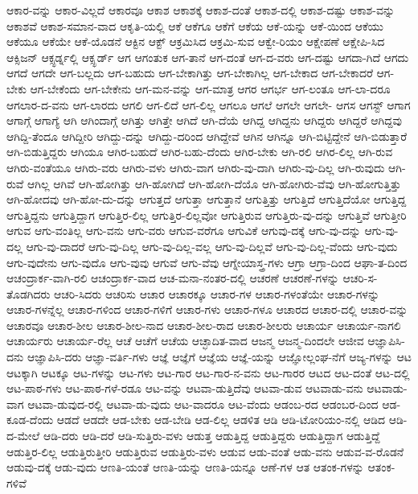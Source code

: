 {ಆಕಾರ-ವನ್ನು
ಆಕಾರ-ವಿಲ್ಲದೆ
ಆಕಾರವೂ
ಆಕಾಶ
ಆಕಾಶಕ್ಕೆ
ಆಕಾಶ-ದಂತೆ
ಆಕಾಶ-ದಲ್ಲಿ
ಆಕಾಶ-ದಷ್ಟು
ಆಕಾಶ-ವನ್ನು
ಆಕಾಶವೆ
ಆಕಾಶ-ಸಮಾನ-ವಾದ
ಆಕೃತಿ-ಯಲ್ಲಿ
ಆಕೆ
ಆಕೆಗೂ
ಆಕೆಗೆ
ಆಕೆಯ
ಆಕೆ-ಯನ್ನು
ಆಕೆ-ಯಿಂದ
ಆಕೆಯು
ಆಕೆಯೂ
ಆಕೆಯೇ
ಆಕೆ-ಯೊಡನೆ
ಆಕ್ಟಿನ
ಆಕ್ಟ್
ಆಕ್ರಮಿಸಿದ
ಆಕ್ರಮಿ-ಸುವ
ಆಕ್ವೇ-ರಿಯಂ
ಆಕ್ಷೇಪಣೆ
ಆಕ್ಷೇಪಿ-ಸಿದ
ಆಕ್ಸಿಜನ್
ಆಕ್ಸ್ಫರ್ಡ್ನಲ್ಲಿ
ಆಕ್ಸ್ಫರ್ಡ್
ಆಗ
ಆಗಂತುಕ
ಆಗ-ತಾನೆ
ಆಗ-ದಂತೆ
ಆಗ-ದ-ವರು
ಆಗ-ದಷ್ಟು
ಆಗದಾ-ಗಿದೆ
ಆಗದು
ಆಗದೆ
ಆಗದೇ
ಆಗ-ಬಲ್ಲದು
ಆಗ-ಬಹುದು
ಆಗ-ಬೇಕಾಗಿತ್ತು
ಆಗ-ಬೇಕಾಗಿಲ್ಲ
ಆಗ-ಬೇಕಾದ
ಆಗ-ಬೇಕಾದರೆ
ಆಗ-ಬೇಕು
ಆಗ-ಬೇಕೆಂದು
ಆಗ-ಬೇಕೇನು
ಆಗ-ಮನ-ವನ್ನು
ಆಗ-ಮಾತ್ರ
ಆಗರ
ಆಗರ್ಭ
ಆಗ-ಲಂತೂ
ಆಗ-ಲಾ-ದರೂ
ಆಗಲಾರ-ದ-ವನು
ಆಗ-ಲಾರದು
ಆಗಲಿ
ಆಗ-ಲಿದೆ
ಆಗ-ಲಿಲ್ಲ
ಆಗಲೂ
ಆಗಲೆ
ಆಗಲೇ
ಆಗಲೇ-
ಆಗಸ
ಆಗಸ್ಟ್
ಆಗಾಗ
ಆಗಾಗ್ಗೆ
ಆಗಾಗ್ಯೆ
ಆಗಿ
ಆಗಿಂದಾಗ್ಗೆ
ಆಗಿತ್ತು
ಆಗಿತ್ತೇ
ಆಗಿದೆ
ಆಗಿ-ದೆಯೆ
ಆಗಿದ್ದ
ಆಗಿದ್ದನು
ಆಗಿದ್ದರು
ಆಗಿದ್ದರೆ
ಆಗಿದ್ದವು
ಆಗಿದ್ದಿ-ತೆಂದೂ
ಆಗಿದ್ದೀರಿ
ಆಗಿದ್ದು-ದನ್ನು
ಆಗಿದ್ದು-ದರಿಂದ
ಆಗಿದ್ದೇವೆ
ಆಗಿನ
ಆಗಿನ್ನೂ
ಆಗಿ-ಬಿಟ್ಟಿದ್ದೇನೆ
ಆಗಿ-ಬಿಡುತ್ತಾರೆ
ಆಗಿ-ಬಿಡುತ್ತಿದ್ದರು
ಆಗಿಯೂ
ಆಗಿರ-ಬಹುದೆ
ಆಗಿರ-ಬಹು-ದೆಂದು
ಆಗಿರ-ಬೇಕು
ಆಗಿ-ರಲಿ
ಆಗಿರ-ಲಿಲ್ಲ
ಆಗಿ-ರುವ
ಆಗಿರು-ವಂತೆಯೂ
ಆಗಿರು-ವರು
ಆಗಿರು-ವಳು
ಆಗಿರು-ವಾಗ
ಆಗಿರು-ವು-ದಾಗಿ
ಆಗಿರು-ವು-ದಿಲ್ಲ
ಆಗಿ-ರುವುದು
ಆಗಿ-ರುವೆ
ಆಗಿಲ್ಲ
ಆಗಿವೆ
ಆಗಿ-ಹೋಗಿತ್ತು
ಆಗಿ-ಹೋಗಿದೆ
ಆಗಿ-ಹೋಗಿ-ದೆಯೊ
ಆಗಿ-ಹೋಗಿರು-ವೆವು
ಆಗಿ-ಹೋಗುತ್ತಿತ್ತು
ಆಗಿ-ಹೋದವು
ಆಗಿ-ಹೋ-ದು-ದನ್ನು
ಆಗುತ್ತದೆ
ಆಗುತ್ತಾ
ಆಗುತ್ತಾನೆ
ಆಗುತ್ತಿತ್ತು
ಆಗುತ್ತಿದೆ
ಆಗುತ್ತಿದೆಯೋ
ಆಗುತ್ತಿದ್ದ
ಆಗುತ್ತಿದ್ದನು
ಆಗುತ್ತಿದ್ದಾಗ
ಆಗುತ್ತಿರ-ಲಿಲ್ಲ
ಆಗುತ್ತಿರ-ಲಿಲ್ಲವೋ
ಆಗುತ್ತಿರುವ
ಆಗುತ್ತಿರು-ವು-ದನ್ನು
ಆಗುತ್ತಿವೆ
ಆಗುತ್ತೀರಿ
ಆಗುವ
ಆಗು-ವಂತಿಲ್ಲ
ಆಗು-ವನು
ಆಗು-ವರು
ಆಗುವ-ವರೆಗೂ
ಆಗುವಿಕೆ
ಆಗುವು-ದಕ್ಕೆ
ಆಗು-ವು-ದನ್ನು
ಆಗು-ವು-ದಲ್ಲ
ಆಗು-ವು-ದಾದರೆ
ಆಗು-ವು-ದಿಲ್ಲ
ಆಗು-ವು-ದಿಲ್ಲ-ವಲ್ಲ
ಆಗು-ವು-ದಿಲ್ಲವೆ
ಆಗು-ವು-ದಿಲ್ಲ-ವೆಂದು
ಆಗು-ವುದು
ಆಗು-ವುದೇನು
ಆಗು-ವುದೊ
ಆಗು-ವುವು
ಆಗುವೆ
ಆಗು-ವೆವು
ಆಗ್ನೇಯಾಸ್ತ್ರ-ಗಳು
ಆಗ್ರಾ
ಆಗ್ರಾ-ದಿಂದ
ಆಘಾ-ತ-ದಿಂದ
ಆಚಂದ್ರಾರ್ಕ-ವಾಗಿ-ರಲಿ
ಆಚಂದ್ರಾರ್ಕ-ವಾದ
ಆಚ-ಮನಾ-ನಂತರ-ದಲ್ಲಿ
ಆಚರಣೆ
ಆಚರಣೆ-ಗಳನ್ನು
ಆಚರಿ-ಸ-ತೊಡಗಿದರು
ಆಚರಿ-ಸಿದರು
ಆಚರಿಸು
ಆಚಾರ
ಆಚಾರಕ್ಕೂ
ಆಚಾರ-ಗಳ
ಆಚಾರ-ಗಳಂತೆಯೇ
ಆಚಾರ-ಗಳನ್ನು
ಆಚಾರ-ಗಳನ್ನೆಲ್ಲ
ಆಚಾರ-ಗಳಿಂದ
ಆಚಾರ-ಗಳಿಗೆ
ಆಚಾರ-ಗಳು
ಆಚಾರ-ಗಳೂ
ಆಚಾರದ
ಆಚಾರ-ದಲ್ಲಿ
ಆಚಾರ-ವನ್ನು
ಆಚಾರವೂ
ಆಚಾರ-ಶೀಲ
ಆಚಾರ-ಶೀಲ-ನಾದ
ಆಚಾರ-ಶೀಲ-ರಾದ
ಆಚಾರ-ಶೀಲರು
ಆಚಾರ್ಯ
ಆಚಾರ್ಯ-ನಾಗಲಿ
ಆಚಾರ್ಯರು
ಆಚಾರ್ಯ-ರೆಲ್ಲ
ಆಚೆ
ಆಚೆಗೆ
ಆಚೆಯ
ಆಚ್ಛಾದಿತ-ವಾದ
ಆಜನ್ಮ
ಆಜನ್ಮ-ದಿಂದಲೇ
ಆಜೀವ
ಆಜ್ಞಾಪಿಸಿ-ದನು
ಆಜ್ಞಾಪಿಸಿ-ದರು
ಆಜ್ಞಾ-ವರ್ತಿ-ಗಳು
ಆಜ್ಞೆ
ಆಜ್ಞೆಗೆ
ಆಜ್ಞೆಯ
ಆಜ್ಞೆ-ಯನ್ನು
ಆಜ್ಞೋಲ್ಲಂಘ-ನೆಗೆ
ಆಜ್ಯ-ಗಳನ್ನು
ಆಟ
ಆಟಕ್ಕಾಗಿ
ಆಟಕ್ಕೂ
ಆಟ-ಗಳನ್ನು
ಆಟ-ಗಳು
ಆಟ-ಗಾರ
ಆಟ-ಗಾರ-ನ-ವನು
ಆಟ-ಗಾರರ
ಆಟದ
ಆಟ-ದಂತೆ
ಆಟ-ದಲ್ಲಿ
ಆಟ-ಪಾಠ-ಗಳು
ಆಟ-ಪಾಠ-ಗಳೆ-ರಡೂ
ಆಟ-ವನ್ನು
ಆಟವಾ-ಡುತ್ತಿದೆವು
ಆಟವಾ-ಡುವ
ಆಟವಾಡು-ವನು
ಆಟವಾಡು-ವಾಗ
ಆಟವಾ-ಡುವುದ-ರಲ್ಲಿ
ಆಟವಾ-ಡು-ವುದು
ಆಟ-ವಾದರೂ
ಆಟ-ವೆಂದು
ಆಡಂಬ-ರದ
ಆಡಂಬರ-ದಿಂದ
ಆಡ-ಕೂಡ-ದೆಂದು
ಆಡದೆ
ಆಡದೇ
ಆಡ-ಬೇಕು
ಆಡ-ಬೇಡಿ
ಆಡ-ಲಿಲ್ಲ
ಆಡಳಿತ
ಆಡಿ
ಆಡಿ-ಟೋರಿಯಂ-ನಲ್ಲಿ
ಆಡಿದ
ಆಡಿ-ದ-ಮೇಲೆ
ಆಡಿ-ದರು
ಆಡಿ-ದರೆ
ಆಡಿ-ಸುತ್ತಿರು-ವಳು
ಆಡುತ್ತ
ಆಡುತ್ತಿದ್ದ
ಆಡುತ್ತಿದ್ದರು
ಆಡುತ್ತಿದ್ದಾಗ
ಆಡುತ್ತಿದ್ದೆ
ಆಡುತ್ತಿರ-ಲಿಲ್ಲ
ಆಡುತ್ತಿರುತ್ತೀರಿ
ಆಡುತ್ತಿರುವ
ಆಡುತ್ತಿರು-ವಳು
ಆಡುವ
ಆಡು-ವಂತೆ
ಆಡು-ವನು
ಆಡುವ-ವ-ರೊಡನೆ
ಆಡುವು-ದಕ್ಕೆ
ಆಡು-ವುದು
ಆಣತಿ-ಯಂತೆ
ಆಣತಿ-ಯನ್ನು
ಆಣತಿ-ಯನ್ನೂ
ಆಣೆ-ಗಳ
ಆತ
ಆತಂಕ-ಗಳನ್ನು
ಆತಂಕ-ಗಳಿವೆ
}
